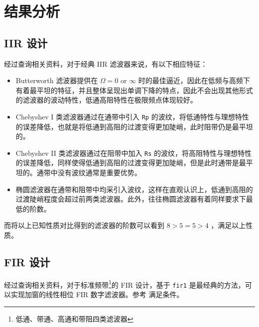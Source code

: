 \documentclass[lang=cn,11pt,a4paper,cite=authoryear]{elegantpaper}
\begin{document}

\section{结果分析}

\subsection{IIR 设计}

经过查询相关资料，对于经典 IIR 滤波器来说，有以下相应特征：

\begin{itemize}
    \item Butterworth 滤波器提供在 \(\Omega = 0 \text{ or } \infty\) 时的最佳逼近，因此在低频与高频下有着最平坦的特征，并且整体呈现出单调下降的特点，因此不会出现其他形式的滤波器的波动特性，低通高阻特性在极限频点体现较好。
    \item Chebyshev I 类滤波器通过在通带中引入 \lstinline{Rp} 的波纹，将低通特性与理想特性的误差降低，也就是将低通到高阻的过渡变得更加陡峭，此时阻带仍是最平坦的。
    \item Chebyshev II 类滤波器通过在阻带中加入 \lstinline{Rs} 的波纹，将高阻特性与理想特性的误差降低，同样使得低通到高阻的过渡变得更加陡峭，但是此时通带是最平坦的。通带中没有波纹通常是重要优势。
    \item 椭圆滤波器在通带和阻带中均采引入波纹，这样在直观认识上，低通到高阻的过渡陡峭程度会超过前两类滤波器。此外，往往椭圆滤波器有着同样要求下最低的阶数。
\end{itemize}

而将以上已知性质对比得到的滤波器的阶数可以看到 \(8 > 5 = 5 > 4\) ，满足以上性质。

\subsection{FIR 设计}

经过查询相关资料，对于标准频带\footnote{低通、带通、高通和带阻四类滤波器}的 FIR 设计，基于 \lstinline{fir1} 是最经典的方法，可以实现加窗的线性相位 FIR 数字滤波器。参考  满足条件。

\end{document}
